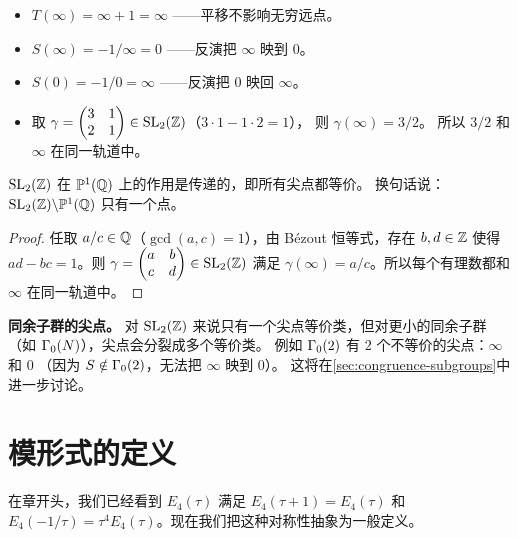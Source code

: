 \begin{example}[具体的尖点变换]
\label{ex:cusp-action}
\leavevmode
\begin{itemize}
  \item $T(\infty) = \infty + 1 = \infty$
    ——平移不影响无穷远点。
  \item $S(\infty) = -1/\infty = 0$
    ——反演把 $\infty$ 映到 $0$。
  \item $S(0) = -1/0 = \infty$
    ——反演把 $0$ 映回 $\infty$。
  \item 取 $\gamma = \begin{pmatrix} 3 & 1 \\ 2 & 1 \end{pmatrix}
    \in \mathrm{SL}_2(\mathbb{Z})$（$3 \cdot 1 - 1 \cdot 2 = 1$），
    则 $\gamma(\infty) = 3/2$。
    所以 $3/2$ 和 $\infty$ 在同一轨道中。
\end{itemize}
\end{example}

\begin{proposition}
\label{prop:cusps-transitive}
$\mathrm{SL}_2(\mathbb{Z})$ 在 $\mathbb{P}^1(\mathbb{Q})$ 上的作用是传递的，即所有尖点都等价。
换句话说：$\mathrm{SL}_2(\mathbb{Z}) \backslash \mathbb{P}^1(\mathbb{Q})$ 只有一个点。
\end{proposition}

\begin{proof}
任取 $a/c \in \mathbb{Q}$（$\gcd(a,c) = 1$），由 Bézout 恒等式，存在 $b, d \in \mathbb{Z}$
使得 $ad - bc = 1$。则
$\gamma = \begin{pmatrix} a & b \\ c & d \end{pmatrix} \in \mathrm{SL}_2(\mathbb{Z})$
满足 $\gamma(\infty) = a/c$。所以每个有理数都和 $\infty$ 在同一轨道中。
\end{proof}

\textbf{同余子群的尖点。}
对 $\mathrm{SL}_2(\mathbb{Z})$ 来说只有一个尖点等价类，但对更小的同余子群
（如 $\Gamma_0(N)$），尖点会分裂成多个等价类。
例如 $\Gamma_0(2)$ 有 $2$ 个不等价的尖点：$\infty$ 和 $0$
（因为 $S \notin \Gamma_0(2)$，无法把 $\infty$ 映到 $0$）。
这将在\cref{sec:congruence-subgroups}中进一步讨论。


\section{模形式的定义}
\label{sec:modular-forms-def}

在章开头，我们已经看到 $E_4(\tau)$ 满足 $E_4(\tau+1) = E_4(\tau)$ 和
$E_4(-1/\tau) = \tau^4 E_4(\tau)$。现在我们把这种对称性抽象为一般定义。

